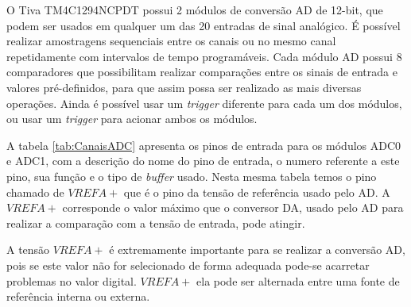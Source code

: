 O Tiva TM4C1294NCPDT possui 2 módulos de conversão AD  de 12-bit, que podem ser usados em qualquer um das 20 entradas de sinal analógico. É possível realizar amostragens sequenciais entre os canais ou no mesmo canal repetidamente com intervalos de tempo  programáveis. Cada módulo AD possui 8 comparadores que possibilitam realizar comparações entre os sinais de entrada e  valores pré-definidos, para que assim possa ser realizado as mais diversas operações.  Ainda é possível usar um \emph{trigger} diferente para cada um dos módulos, ou usar um \emph{trigger} para acionar ambos os módulos.

A tabela \ref{tab:CanaisADC} apresenta os pinos de entrada para os módulos ADC0 e ADC1, com a descrição do nome do pino de entrada, o numero referente a este pino, sua função e o tipo de \emph{buffer} usado. Nesta mesma tabela temos o  pino chamado de $VREFA+$ que é o pino da tensão de referência usado pelo AD. A $VREFA+$ corresponde o valor máximo que o conversor DA, usado pelo AD para realizar a comparação com a tensão de entrada, pode atingir. 

A tensão $VREFA+$ é extremamente importante para se realizar a conversão AD, pois se este valor não for selecionado de forma adequada pode-se acarretar problemas no valor digital. $VREFA+$ ela pode ser alternada entre uma fonte de referência interna ou externa. 


